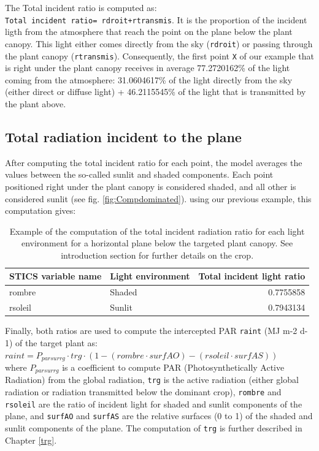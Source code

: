 \documentclass[]{book}
\theoremstyle{definition}
\theoremstyle{definition}
\theoremstyle{definition}
\theoremstyle{remark}
\begin{document}
The Total incident ratio is computed as:
\texttt{Total\ incident\ ratio=\ rdroit+rtransmis}. It is the proportion
of the incident ligth from the atmosphere that reach the point on the
plane below the plant canopy. This light either comes directly from the
sky (\texttt{rdroit}) or passing through the plant canopy
(\texttt{rtransmis}). Consequently, the first point \texttt{X} of our
example that is right under the plant canopy receives in average
77.2720162\% of the light coming from the atmosphere: 31.0604617\% of
the light directly from the sky (either direct or diffuse light) +
46.2115545\% of the light that is transmitted by the plant above.

\subsection{Total radiation incident to the
plane}\label{total-radiation-incident-to-the-plane}

After computing the total incident ratio for each point, the model
averages the values between the so-called sunlit and shaded components.
Each point positioned right under the plant canopy is considered shaded,
and all other is considered sunlit (see fig. \ref{fig:Compdominated}).
using our previous example, this computation gives:

\begin{table}

\caption{\label{tab:unnamed-chunk-6}Example of the computation of the total incident radiation ratio for each light environment for a horizontal plane below the targeted plant canopy. See introduction section for further details on the crop.}
\centering
\begin{tabular}[t]{l|l|r}
\hline
STICS variable name & Light environment & Total incident light ratio\\
\hline
rombre & Shaded & 0.7755858\\
\hline
rsoleil & Sunlit & 0.7943134\\
\hline
\end{tabular}
\end{table}

Finally, both ratios are used to compute the intercepted PAR
\texttt{raint} (MJ m-2 d-1) of the target plant as:\\
\(raint=P_{parsurrg}\cdot trg\cdot(1-(rombre\cdot surfAO)-(rsoleil\cdot surfAS))\)\\
where \(P_{parsurrg}\) is a coefficient to compute PAR
(Photosynthetically Active Radiation) from the global radiation,
\texttt{trg} is the active radiation (either global radiation or
radiation transmitted below the dominant crop), \texttt{rombre} and
\texttt{rsoleil} are the ratio of incident light for shaded and sunlit
components of the plane, and \texttt{surfAO} and \texttt{surfAS} are the
relative surfaces (0 to 1) of the shaded and sunlit components of the
plane. The computation of \texttt{trg} is further described in Chapter
\ref{trg}.
\end{document}
